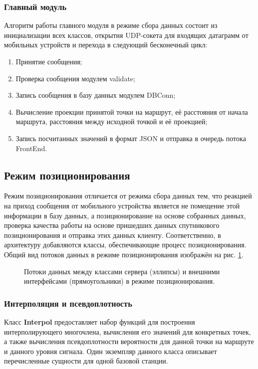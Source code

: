 \subsubsection{Главный модуль}
\label{subsubsec:collect-data-main}
Алгоритм работы главного модуля в режиме сбора данных состоит из инициализации всех классов, открытия UDP-сокета для входящих датаграмм от мобильных устройств и перехода в следующий бесконечный цикл:
\begin{enumerate}
	\item
		Принятие сообщения;
	\item
		Проверка сообщения модулем validate;
	\item
		Запись сообщения в базу данных модулем DBConn;
	\item
		Вычисление проекции принятой точки на маршрут, её расстояния от начала маршрута, расстояния между исходной точкой и её проекцией;
	\item
		Запись посчитанных значений в формат JSON и отправка в очередь потока FrontEnd.
\end{enumerate}

\subsection{Режим позиционирования}
Режим позиционирования отличается от режима сбора данных тем, что реакцией на приход сообщения от мобильного устройства является не помещение этой информации в базу данных, а позиционирование на основе собранных данных, проверка качества работы на основе пришедших данных спутникового позиционирования и отправка этих данных клиенту. Соответственно, в архитектуру добавляются классы, обеспечивающие процесс позиционирования. Общий вид потоков данных в режиме позиционирования изображён на рис. \ref{fig:server-perform-dataflow}.

\begin{figure}[h]
	\caption{Потоки данных между классами сервера (эллипсы) и внешними интерфейсами (прямоугольники) в режиме позиционирования.}
	\label{fig:server-perform-dataflow}
\end{figure}

\subsubsection{Интерполяция и псевдоплотность}
Класс {\bf{}Interpol} предоставляет набор функций для построения интерполирующего многочлена, вычисления его значений для конкретных точек, а также вычисления псевдоплотности вероятности для данной точки на маршруте и данного уровня сигнала. Один экземпляр данного класса описывает перечисленные сущности для одной базовой станции.

